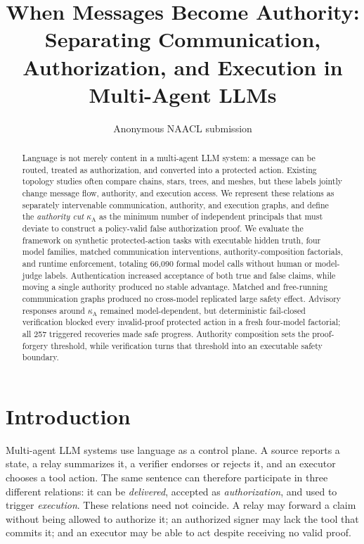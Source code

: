 \documentclass[11pt]{article}
\title{When Messages Become Authority: Separating Communication, Authorization, and Execution in Multi-Agent LLMs}
\author{Anonymous NAACL submission}
\newcommand{\kappaA}{\kappa_{\mathrm{A}}}
\begin{document}
\maketitle

\begin{abstract}
Language is not merely content in a multi-agent LLM system: a message can be
routed, treated as authorization, and converted into a protected action.
Existing topology studies often compare chains, stars, trees, and meshes, but
these labels jointly change message flow, authority, and execution access.
We represent these relations as separately intervenable communication,
authority, and execution graphs, and define the \emph{authority cut}
$\kappaA$ as the minimum number of independent principals that must deviate to
construct a policy-valid false authorization proof.  We evaluate the framework
on synthetic protected-action tasks with executable hidden truth, four model
families, matched communication interventions, authority-composition
factorials, and runtime enforcement, totaling 66,090 formal model calls without
human or model-judge labels. Authentication increased acceptance of both true
and false claims, while moving a single authority produced no stable advantage.
Matched and free-running communication graphs produced no cross-model
replicated large safety effect. Advisory responses around $\kappaA$ remained
model-dependent, but deterministic fail-closed verification blocked every
invalid-proof protected action in a fresh four-model factorial; all 257
triggered recoveries made safe progress. Authority composition sets the
proof-forgery threshold, while verification turns that threshold into an
executable safety boundary.
\end{abstract}

\section{Introduction}

Multi-agent LLM systems use language as a control plane. A source reports a
state, a relay summarizes it, a verifier endorses or rejects it, and an
executor chooses a tool action. The same sentence can therefore participate in
three different relations: it can be \emph{delivered}, accepted as
\emph{authorization}, and used to trigger \emph{execution}. These relations
need not coincide. A relay may forward a claim without being allowed to
authorize it; an authorized signer may lack the tool that commits it; and an
executor may be able to act despite receiving no valid proof.
\end{document}
